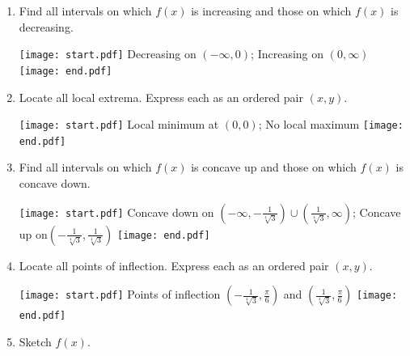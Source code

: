 \documentclass[12pt]{article}
\begin{document}
\begin{enumerate}
\begin{enumerate}
\item Find all intervals on which $f(x)$ is increasing and those on which $f(x)$ is decreasing.

\texttt{[image: start.pdf]}
{Decreasing on $(-\infty,0)$; Increasing on $(0,\infty)$}
\texttt{[image: end.pdf]}


\item Locate all local extrema.  Express each as an ordered pair $(x,y)$.

\texttt{[image: start.pdf]}
{Local minimum at $(0,0)$; No local maximum}
\texttt{[image: end.pdf]}


\item Find all intervals on which $f(x)$ is concave up and those on which $f(x)$ is concave down.

\texttt{[image: start.pdf]}
{Concave down on $\left(-\infty,-\frac{1}{\sqrt[4]{3}}\right)\cup\left(\frac{1}{\sqrt[4]{3}},\infty\right)$; Concave up on$\left(-\frac{1}{\sqrt[4]{3}},\frac{1}{\sqrt[4]{3}}\right)$}
\texttt{[image: end.pdf]}


\item Locate all points of inflection.  Express each as an ordered pair $(x,y)$.

\texttt{[image: start.pdf]}
{Points of inflection $\left(-\frac{1}{\sqrt[4]{3}},\frac{\pi}{6}\right)$ and $\left(\frac{1}{\sqrt[4]{3}},\frac{\pi}{6}\right)$}
\texttt{[image: end.pdf]}


\item Sketch $f(x)$.


\end{enumerate}
\end{enumerate}
\end{document}
